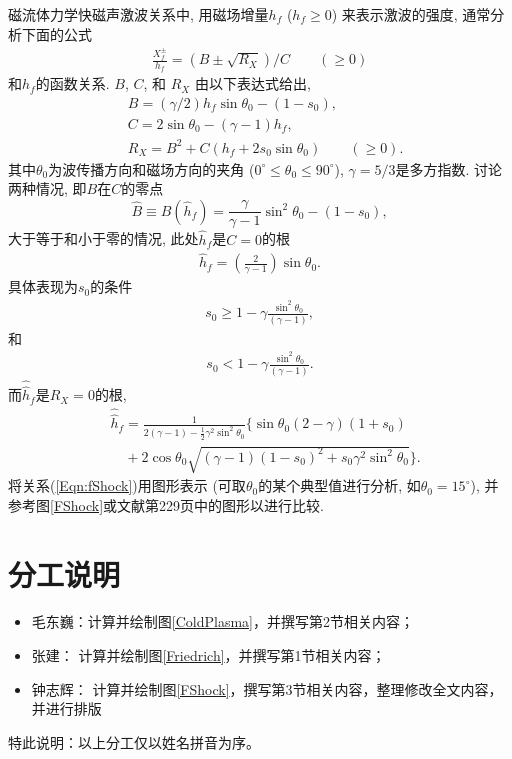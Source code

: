 \documentclass{article}
\begin{document}
	磁流体力学快磁声激波关系中\citep{Jeffrey1964}, 用磁场增量$h_f$ ($h_f \ge 0$)
	来表示激波的强度, 通常分析下面的公式
	\begin{align}
		\frac{X_f^\pm}{h_f} = (B \pm \sqrt{R_X})/C \qquad (\ge 0) \label{Eqn:fShock}
	\end{align}
	和$h_f$的函数关系. $B$, $C$, 和 $R_X$ 由以下表达式给出,
	\begin{align}
		& B = (\gamma/2) h_f \sin\theta_0 - (1-s_0),
		\\
		& C = 2 \sin\theta_0 - (\gamma-1) h_f,
		\\
		& R_X = B^2 + C(h_f + 2 s_0 \sin\theta_0) \qquad (\ge 0).
	\end{align}
	其中$\theta_0$为波传播方向和磁场方向的夹角 ($0^\circ \le \theta_0 \le 90^\circ$),
	$\gamma=5/3$是多方指数. 讨论两种情况, 即$B$在$C$的零点
	$$
	\hat{B} \equiv B(\hat{h}_f) = \frac{\gamma}{\gamma-1} \sin^2\theta_0 - (1-s_0),
	$$
	大于等于和小于零的情况, 此处$\hat{h}_f$是$C=0$的根
	\begin{align}
		\hat{h}_f = \left(\frac{2}{\gamma-1}\right) \sin\theta_0.
	\end{align}
	具体表现为$s_0$的条件
	\begin{align}
		s_0 \ge 1 - \gamma \frac{\sin^2\theta_0}{(\gamma-1)},
	\end{align}
	和
	\begin{align}
		s_0 < 1 - \gamma \frac{\sin^2\theta_0}{(\gamma-1)}.
	\end{align}
	而$\hat{\hat{h}}_f$是$R_X = 0$的根,
	\begin{align}
		& \hat{\hat{h}}_f = \frac{1}{2(\gamma-1) - \frac{1}{2} \gamma^2 \sin^2
			\theta_0}\Big\{\sin\theta_0
		(2-\gamma)(1+s_0) \nonumber
		\\
		& \quad + 2\cos\theta_0 \sqrt{(\gamma-1)(1-s_0)^2 + s_0 \gamma^2 \sin^2\theta_0}\Big\}.
	\end{align}
	将关系(\ref{Eqn:fShock})用图形表示
	(可取$\theta_0$的某个典型值进行分析, 如$\theta_0=15^\circ$),
	并参考图\ref{FShock}或文献\citet{Jeffrey1964}第229页中的图形以进行比较.

	\section{分工说明}
	
	\begin{itemize}
		\item 毛东巍：计算并绘制图\ref{ColdPlasma}，并撰写第2节相关内容；
		\item 张建： 计算并绘制图\ref{Friedrich}，并撰写第1节相关内容；
		\item 钟志辉： 计算并绘制图\ref{FShock}，撰写第3节相关内容，整理修改全文内容，并进行排版
	\end{itemize}
	特此说明：以上分工仅以姓名拼音为序。
	
\end{document}
